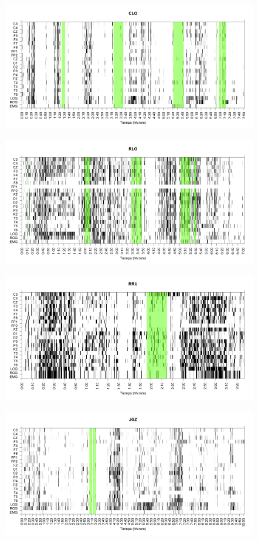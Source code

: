 \documentclass[12pt,a4paper]{mitthesis}
\begin{document}
\begin{figure}
\centering
\includegraphics[width=0.9\linewidth]
{./g170413/CLMN10SUE_est.png} 
\label{grf_CLO}
\end{figure}

\begin{figure}
\centering
\includegraphics[width=0.9\linewidth]
{./g170413/RLMN10SUE_est.png} 
\label{grf_RLO}
\end{figure}

\begin{figure}
\centering
\includegraphics[width=0.9\linewidth]
{./g170413/RRMNS_est.png} 
\label{grf_RRU}
\end{figure}

\begin{figure}
\centering
\includegraphics[width=0.9\linewidth]
{./g170413/JGMN6SUE_est.png} 
\label{grf_JGZ}
\end{figure}
\end{document}
